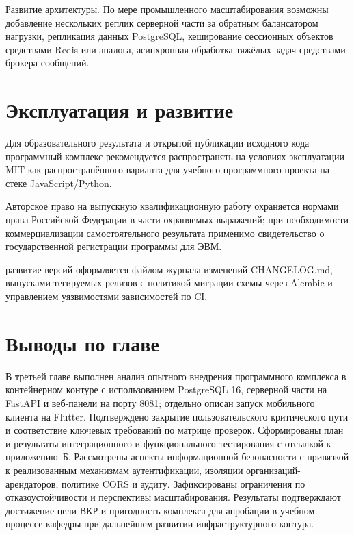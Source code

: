 Развитие архитектуры. По мере промышленного масштабирования возможны добавление нескольких реплик серверной части за обратным балансатором нагрузки, репликация данных PostgreSQL, кеширование сессионных объектов средствами Redis или аналога, асинхронная обработка тяжёлых задач средствами брокера сообщений.

\section{Эксплуатация и развитие}

Для образовательного результата и открытой публикации исходного кода программный комплекс рекомендуется распространять на условиях эксплуатации MIT как распространённого варианта для учебного программного проекта на стеке JavaScript/Python.

Авторское право на выпускную квалификационную работу охраняется нормами права Российской Федерации в части охраняемых выражений; при необходимости коммерциализации самостоятельного результата применимо свидетельство о государственной регистрации программы для ЭВМ.

развитие версий оформляется файлом журнала изменений CHANGELOG.md, выпусками тегируемых релизов с политикой миграции схемы через Alembic и управлением уязвимостями зависимостей по CI.

\section{Выводы по главе}

В третьей главе выполнен анализ опытного внедрения программного комплекса в контейнерном контуре с использованием PostgreSQL 16, серверной части на FastAPI и веб-панели на порту 8081; отдельно описан запуск мобильного клиента на Flutter. Подтверждено закрытие пользовательского критического пути и соответствие ключевых требований по матрице проверок. Сформированы план и результаты интеграционного и функционального тестирования с отсылкой к приложению~Б. Рассмотрены аспекты информационной безопасности с привязкой к реализованным механизмам аутентификации, изоляции организаций-арендаторов, политике CORS и аудиту. Зафиксированы ограничения по отказоустойчивости и перспективы масштабирования. Результаты подтверждают достижение цели ВКР и пригодность комплекса для апробации в учебном процессе кафедры при дальнейшем развитии инфраструктурного контура.
